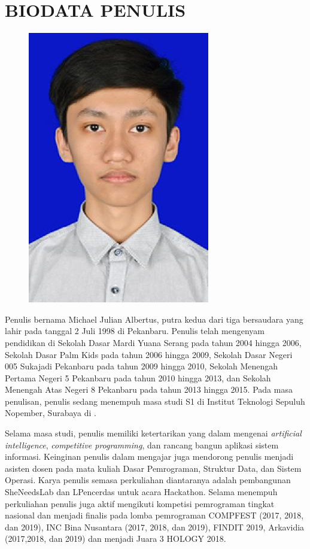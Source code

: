 \chapter{BIODATA PENULIS}

\begin{figure}
	\includegraphics[height=0.3\textheight]{penutup/img/foto.jpeg}
\end{figure}

Penulis bernama Michael Julian Albertus, putra kedua dari tiga bersaudara yang lahir pada tanggal 2 Juli 1998 di Pekanbaru. Penulis telah mengenyam pendidikan di Sekolah Dasar Mardi Yuana Serang pada tahun 2004 hingga 2006, Sekolah Dasar Palm Kids pada tahun 2006 hingga 2009, Sekolah Dasar Negeri 005 Sukajadi Pekanbaru pada tahun 2009 hingga 2010, Sekolah Menengah Pertama Negeri 5 Pekanbaru pada tahun 2010 hingga 2013, dan Sekolah Menengah Atas Negeri 8 Pekanbaru pada tahun 2013 hingga 2015. Pada masa penulisan, penulis sedang menempuh masa studi S1 di Institut Teknologi Sepuluh Nopember, Surabaya di \jurusan.

Selama masa studi, penulis memiliki ketertarikan yang dalam mengenai \textit{artificial intelligence}, \textit{competitive programming}, dan rancang bangun aplikasi sistem informasi. Keinginan penulis dalam mengajar juga mendorong penulis menjadi asisten dosen pada mata kuliah Dasar Pemrograman, Struktur Data, dan Sistem Operasi. Karya penulis semasa perkuliahan diantaranya adalah pembangunan SheNeedsLab dan LPencerdas untuk acara Hackathon. Selama menempuh perkuliahan penulis juga aktif mengikuti kompetisi pemrograman tingkat nasional dan menjadi finalis pada lomba pemrograman COMPFEST (2017, 2018, dan 2019), INC Bina Nusantara (2017, 2018, dan 2019), FINDIT 2019, Arkavidia (2017,2018, dan 2019) dan menjadi Juara 3 HOLOGY 2018.

